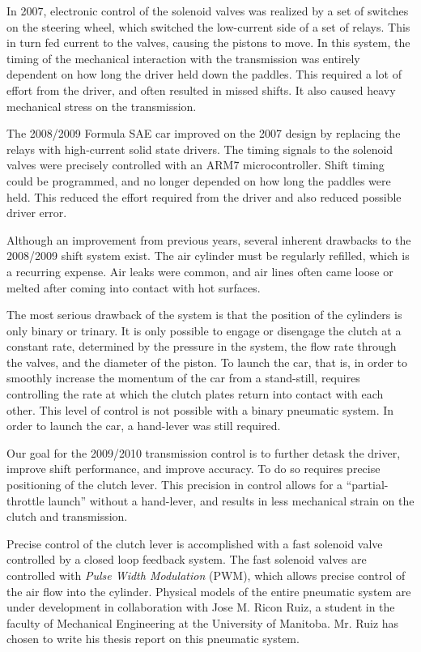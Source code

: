 In 2007, electronic control of the solenoid valves was realized by a set of switches on the steering wheel, which switched the low-current side of a set of relays. This in turn fed current to the valves, causing the pistons to move. In this system, the timing of the mechanical interaction with the transmission was entirely dependent on how long the driver held down the paddles. This required a lot of effort from the driver, and often resulted in missed shifts. It also caused heavy mechanical stress on the transmission. 

The 2008/2009 Formula SAE car improved on the 2007 design by replacing the relays with high-current solid state drivers. The timing signals to the solenoid valves were precisely controlled with an ARM7 microcontroller. Shift timing could be programmed, and no longer depended on how long the paddles were held. This  reduced the effort required from the driver and also reduced possible driver error.

Although an improvement from previous years, several inherent drawbacks to the 2008/2009 shift system exist. The air cylinder must be regularly refilled, which is a recurring expense. Air leaks were common, and air lines often came loose or melted after coming into contact with hot surfaces. 

The most serious drawback of the system is that the position of the cylinders is only binary or trinary. It is only possible to engage or disengage the clutch at a constant rate, determined by the pressure in the system, the flow rate through the valves, and the diameter of the piston. To launch the car, that is, in order to smoothly increase the momentum of the car from a stand-still, requires controlling the rate at which the clutch plates return into contact with each other. This level of control is not possible with a binary pneumatic system. In order to launch the car, a hand-lever was still required.

Our goal for the 2009/2010 transmission control is to further detask the driver, improve shift performance, and improve accuracy. To do so requires precise positioning of the clutch lever. This precision in control allows for a {}``partial-throttle launch'' without a hand-lever, and results in less mechanical strain on the clutch and transmission. 


Precise control of the clutch lever is accomplished with a fast solenoid valve controlled by a closed loop feedback system. The fast solenoid valves are controlled with \emph{Pulse Width Modulation} (PWM), which allows precise control of the air flow into the cylinder. Physical models of the entire pneumatic system are under development in collaboration with Jose M. Ricon Ruiz, a student in the faculty of Mechanical Engineering at the University of Manitoba. Mr. Ruiz has chosen to write his thesis report on this pneumatic system. 

